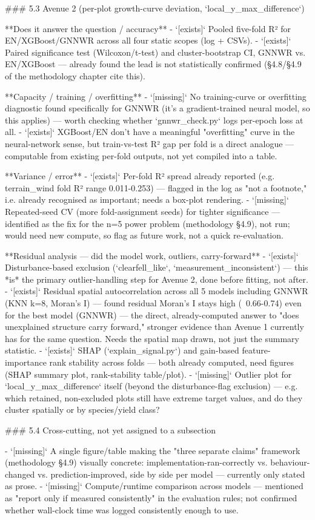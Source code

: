 ### 5.3 Avenue 2 (per-plot growth-curve deviation, `local_y_max_difference`)

**Does it answer the question / accuracy**
- `[exists]` Pooled five-fold R² for EN/XGBoost/GNNWR across all four static scopes (log + CSVs).
- `[exists]` Paired significance test (Wilcoxon/t-test) and cluster-bootstrap CI, GNNWR vs. EN/XGBoost — already found the lead is not statistically confirmed (§4.8/§4.9 of the methodology chapter cite this).

**Capacity / training / overfitting**
- `[missing]` No training-curve or overfitting diagnostic found specifically for GNNWR (it's a gradient-trained neural model, so this applies) — worth checking whether `gnnwr_check.py` logs per-epoch loss at all.
- `[exists]` XGBoost/EN don't have a meaningful "overfitting" curve in the neural-network sense, but train-vs-test R² gap per fold is a direct analogue — computable from existing per-fold outputs, not yet compiled into a table.

**Variance / error**
- `[exists]` Per-fold R² spread already reported (e.g. terrain_wind fold R² range 0.011-0.253) — flagged in the log as "not a footnote," i.e. already recognised as important; needs a box-plot rendering.
- `[missing]` Repeated-seed CV (more fold-assignment seeds) for tighter significance — identified as the fix for the n=5 power problem (methodology §4.9), not run; would need new compute, so flag as future work, not a quick re-evaluation.

**Residual analysis — did the model work, outliers, carry-forward**
- `[exists]` Disturbance-based exclusion (`clearfell_like`, `measurement_inconsistent`) — this *is* the primary outlier-handling step for Avenue 2, done before fitting, not after.
- `[exists]` Residual spatial autocorrelation across all 5 models including GNNWR (KNN k=8, Moran's I) — found residual Moran's I stays high (~0.66-0.74) even for the best model (GNNWR) — the direct, already-computed answer to "does unexplained structure carry forward," stronger evidence than Avenue 1 currently has for the same question. Needs the spatial map drawn, not just the summary statistic.
- `[exists]` SHAP (`explain_signal.py`) and gain-based feature-importance rank stability across folds — both already computed, need figures (SHAP summary plot, rank-stability table/plot).
- `[missing]` Outlier plot for `local_y_max_difference` itself (beyond the disturbance-flag exclusion) — e.g. which retained, non-excluded plots still have extreme target values, and do they cluster spatially or by species/yield class?

### 5.4 Cross-cutting, not yet assigned to a subsection

- `[missing]` A single figure/table making the "three separate claims" framework (methodology §4.9) visually concrete: implementation-ran-correctly vs. behaviour-changed vs. prediction-improved, side by side per model — currently only stated as prose.
- `[missing]` Compute/runtime comparison across models — mentioned as "report only if measured consistently" in the evaluation rules; not confirmed whether wall-clock time was logged consistently enough to use.
 